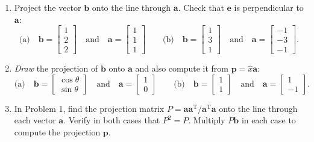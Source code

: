 \documentclass[14pt, a4paper]{article}
\begin{document}
\begin{enumerate}
    \item Project the vector $\boldsymbol{b}$ onto the line through $\boldsymbol{a}$. Check that $\boldsymbol{e}$ is perpendicular to $\boldsymbol{a}$:
          \[
              \text{(a)} \quad \boldsymbol{b} = \begin{bmatrix} 1 \\ 2 \\ 2 \end{bmatrix} \quad \text{and} \quad \boldsymbol{a} = \begin{bmatrix} 1 \\ 1 \\ 1 \end{bmatrix} \qquad
              \text{(b)} \quad \boldsymbol{b} = \begin{bmatrix} 1 \\ 3 \\ 1 \end{bmatrix} \quad \text{and} \quad \boldsymbol{a} = \begin{bmatrix} -1 \\ -3 \\ -1 \end{bmatrix}.
          \]

    \item \emph{Draw} the projection of $\boldsymbol{b}$ onto $\boldsymbol{a}$ and also compute it from $\boldsymbol{p} = \widehat{x}\boldsymbol{a}$:
          \[
              \text{(a)} \quad \boldsymbol{b} = \begin{bmatrix} \cos\theta \\ \sin\theta \end{bmatrix} \quad \text{and} \quad \boldsymbol{a} = \begin{bmatrix} 1 \\ 0 \end{bmatrix} \qquad
              \text{(b)} \quad \boldsymbol{b} = \begin{bmatrix} 1 \\ 1 \end{bmatrix} \quad \text{and} \quad \boldsymbol{a} = \begin{bmatrix} 1 \\ -1 \end{bmatrix}.
          \]

    \item In Problem 1, find the projection matrix $P = \boldsymbol{a}\boldsymbol{a}^{\mathrm{T}} / \boldsymbol{a}^{\mathrm{T}}\boldsymbol{a}$ onto the line through each vector $\boldsymbol{a}$. Verify in both cases that $P^2 = P$. Multiply $P\boldsymbol{b}$ in each case to compute the projection $\boldsymbol{p}$.


\end{enumerate}
\end{document}
